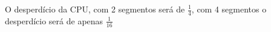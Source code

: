 \begin{question}

	O desperdício da CPU, com 2 segmentos será de $\frac{1}{4}$, com 4 segmentos 
	o desperdício será de apenas $\frac{1}{16}$
\end{question}
